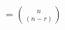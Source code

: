 \documentclass[preview]{standalone}
\begin{document}
\begin{center}
$= \binom{n}{(n - r)}$
\end{center}
\end{document}
